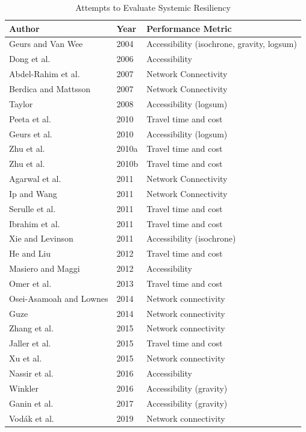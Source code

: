 \begin{table}

\caption{\label{tab:authortable}Attempts to Evaluate Systemic Resiliency}
\centering
\begin{tabular}[t]{lll}
\toprule
Author & Year & Performance Metric\\
\midrule
Geurs and Van Wee & 2004 & Accessibility (isochrone, gravity, logsum)\\
Dong et al. & 2006 & Accessibility\\
Abdel-Rahim et al. & 2007 & Network Connectivity\\
Berdica and Mattsson & 2007 & Network Connectivity\\
\addlinespace
Taylor & 2008 & Accessibility (logsum)\\
Peeta et al. & 2010 & Travel time and cost\\
Geurs et al. & 2010 & Accessibility (logsum)\\
Zhu et al. & 2010a & Travel time and cost\\
\addlinespace
Zhu et al. & 2010b & Travel time and cost\\
Agarwal et al. & 2011 & Network Connectivity\\
Ip and Wang & 2011 & Network Connectivity\\
Serulle et al. & 2011 & Travel time and cost\\
\addlinespace
Ibrahim et al. & 2011 & Travel time and cost\\
Xie and Levinson & 2011 & Accessibility (isochrone)\\
He and Liu & 2012 & Travel time and cost\\
Masiero and Maggi & 2012 & Accessibility \\
\addlinespace
Omer et al. & 2013 & Travel time and cost\\
Osei-Asamoah and Lownes & 2014 & Network connectivity\\
Guze & 2014 & Network connectivity\\
Zhang et al. & 2015 & Network connectivity\\
\addlinespace
Jaller et al. & 2015 & Travel time and cost\\
Xu et al. & 2015 & Network connectivity\\
Nassir et al. & 2016 & Accessibility \\
Winkler & 2016 & Accessibility (gravity)\\
\addlinespace
Ganin et al. & 2017 & Accessibility (gravity)\\
Vodák et al. & 2019 & Network connectivity\\
\bottomrule
\end{tabular}
\end{table}

